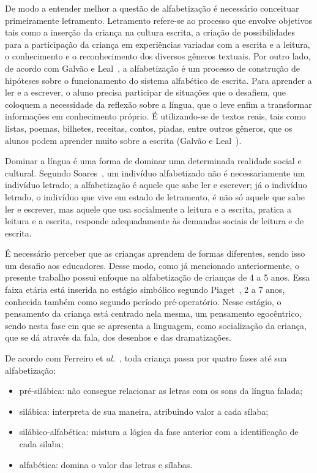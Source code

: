 \documentclass{sigchi}
\begin{document}
De modo a entender melhor a questão de alfabetização é necessário conceituar primeiramente letramento. Letramento refere-se ao processo que envolve objetivos tais como a inserção da criança na cultura escrita, a criação de possibilidades para a participação da criança em experiências variadas com a escrita e a leitura, o conhecimento e o reconhecimento dos diversos gêneros textuais. Por outro lado, de acordo com Galvão e Leal~\cite{galvao2005ha}, a alfabetização é um processo de construção de hipóteses sobre o funcionamento do sistema alfabético de escrita. Para aprender a ler e a escrever, o aluno precisa participar de situações que o desafiem, que coloquem a necessidade da reflexão sobre a língua, que o leve enfim a transformar informações em conhecimento próprio. É utilizando-se de textos reais, tais como listas, poemas, bilhetes, receitas, contos, piadas, entre outros gêneros, que os alunos podem aprender muito sobre a escrita (Galvão e Leal~\cite{galvao2005ha}).

Dominar a língua é uma forma de dominar uma determinada realidade social e cultural. Segundo Soares~\cite{soares2002letramento}, um indivíduo alfabetizado não é necessariamente um indivíduo letrado; a alfabetização é aquele que sabe ler e escrever; já o indivíduo letrado, o indivíduo que vive em estado de letramento, é não só aquele que sabe ler e escrever, mas aquele que usa socialmente a leitura e a escrita, pratica a leitura e a escrita, responde adequadamente às demandas sociais de leitura e de escrita.

É necessário perceber que as crianças aprendem de formas diferentes, sendo isso um desafio aos educadores. Desse modo, como já mencionado anteriormente, o presente trabalho possui enfoque na alfabetização de crianças de 4 a 5 anos. Essa faixa etária está inserida no estágio simbólico segundo Piaget~\cite{piaget1994psicologia}, 2 a 7 anos, conhecida também como segundo período pré-operatório. Nesse estágio, o pensamento da criança está centrado nela mesma, um pensamento egocêntrico, sendo nesta fase em que se apresenta a linguagem, como socialização da criança, que se dá através da fala, dos desenhos e das dramatizações. 

De acordo com Ferreiro et \textit{al.}~\cite{ferreiro1986psicogenese}, toda criança passa por quatro fases até sua alfabetização:

\begin{itemize}
    \item pré-silábica: não consegue relacionar as letras com os sons da língua falada;
    \item silábica: interpreta de sua maneira, atribuindo valor a cada sílaba;
    \item silábico-alfabética: mistura a lógica da fase anterior com a identificação de cada silaba;
    \item alfabética: domina o valor das letras e sílabas.
\end{itemize}
    
\end{document}
